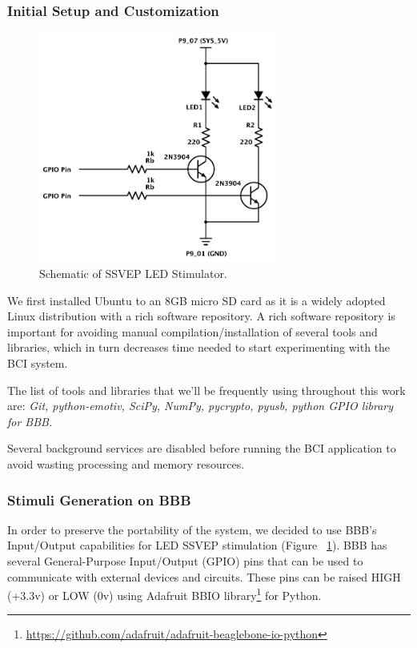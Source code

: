 \documentclass[12pt]{article}
\newcommand\mysubsubsection[1]{\subsubsection{#1}}
\numberwithin{equation}{section}
\numberwithin{figure}{section}
\numberwithin{table}{section}
\begin{document}
\mysubsubsection{Initial Setup and Customization}\label{seq:embeddedcomputer_initialsetup}
\par{
    \begin{figure}[ht]
        \centering
        \includegraphics[width=0.7\textwidth]{images/led_circuit}
        \caption{Schematic of SSVEP LED Stimulator.}
        \label{fig:bbb_led_schema}
    \end{figure}
    We first installed Ubuntu to an 8GB micro SD card as it is a widely adopted Linux distribution with a rich software repository.
    A rich software repository is important for avoiding manual compilation/installation of several tools and libraries,
    which in turn decreases time needed to start experimenting with the BCI system.
}

\par{
    The list of tools and libraries that we'll be frequently using throughout this work are: {\em Git, python-emotiv, SciPy, NumPy, pycrypto, pyusb, python GPIO library for BBB.}
}

\par{
    Several background services are disabled before running the BCI application to avoid wasting
    processing and memory resources.
}

\mysubsubsection{Stimuli Generation on BBB}\label{seq:embeddedcomputer_stimuligen}
\par{
    In order to preserve the portability of the system, we decided to use BBB's
    Input/Output capabilities for LED SSVEP stimulation (Figure ~\ref{fig:bbb_led_schema}).
    BBB has several General-Purpose Input/Output (GPIO) pins that can be used to communicate with external
    devices and circuits. These pins can be raised HIGH (+3.3v) or LOW (0v)
    using Adafruit BBIO library\footnote{\url{https://github.com/adafruit/adafruit-beaglebone-io-python}} for Python.
}
\end{document}
